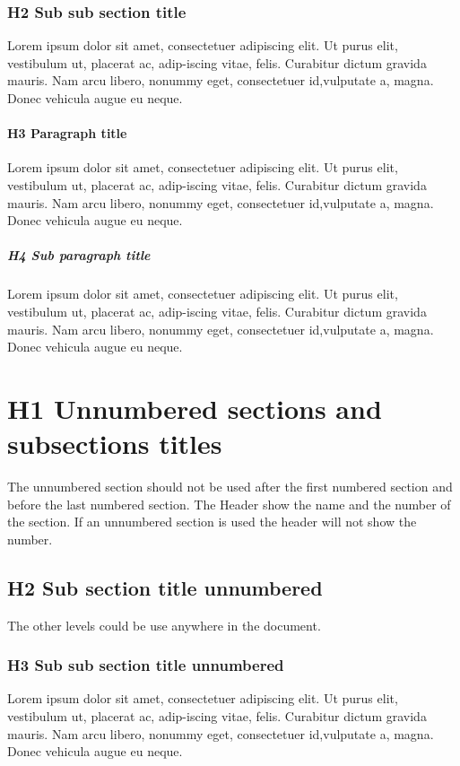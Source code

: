 \documentclass[Theme1]{{template_material/eurostat}}
\begin{document}
\subsubsection{H2 Sub sub section title}
Lorem ipsum dolor sit amet, consectetuer adipiscing elit. Ut purus elit, vestibulum ut, placerat ac, adip-iscing vitae, felis. Curabitur dictum gravida mauris. Nam arcu libero, nonummy eget, consectetuer id,vulputate a, magna. Donec vehicula augue eu neque.
\paragraph{H3 Paragraph title}
Lorem ipsum dolor sit amet, consectetuer adipiscing elit. Ut purus elit, vestibulum ut, placerat ac, adip-iscing vitae, felis. Curabitur dictum gravida mauris. Nam arcu libero, nonummy eget, consectetuer id,vulputate a, magna. Donec vehicula augue eu neque.
\subparagraph{H4 Sub paragraph title}
Lorem ipsum dolor sit amet, consectetuer adipiscing elit. Ut purus elit, vestibulum ut, placerat ac, adip-iscing vitae, felis. Curabitur dictum gravida mauris. Nam arcu libero, nonummy eget, consectetuer id,vulputate a, magna. Donec vehicula augue eu neque.
\newpage %

\section*{H1 Unnumbered sections and subsections titles}

The unnumbered section should not be used after the first numbered section and before the last numbered section. The Header show the name and the number of the section. If an unnumbered section is used the header will not show the number. 

\subsection*{H2 Sub section title unnumbered }

The other levels could be use anywhere in the document.

\subsubsection*{H3 Sub sub section title unnumbered}

Lorem ipsum dolor sit amet, consectetuer adipiscing elit. Ut purus elit, vestibulum ut, placerat ac, adip-iscing vitae, felis. Curabitur dictum gravida mauris. Nam arcu libero, nonummy eget, consectetuer id,vulputate a, magna. Donec vehicula augue eu neque.
\end{document}
